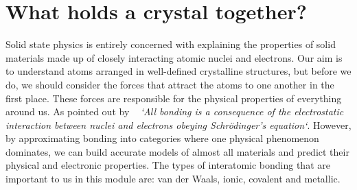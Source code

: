 \chapter{What holds a crystal together?}
\label{sec:bonding}


Solid state physics is entirely concerned with explaining the
properties of solid materials made up of closely interacting
atomic nuclei and electrons.  Our aim is to understand atoms arranged in well-defined crystalline structures, but before
we do, we should consider the forces that
attract the atoms to one another in the first place.  These
forces are responsible for the physical properties of everything
around us. As pointed out by
~\cite{Hook_and_hall} \emph{`All bonding is a consequence of the
electrostatic interaction between nuclei and electrons obeying
Schr\"{o}dinger's equation`}. However, by approximating bonding into categories where one physical phenomenon dominates, we can build accurate models of almost all materials and predict 
their physical and electronic properties. The types of interatomic bonding that are important to us in this module are: van der Waals, ionic, covalent and metallic.
